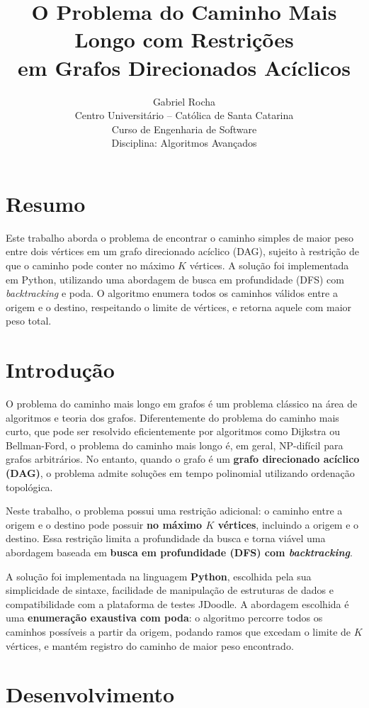 \documentclass[12pt]{article}
\title{O Problema do Caminho Mais Longo com Restrições\\em Grafos Direcionados Acíclicos}
\author{
  Gabriel Rocha\\
  Centro Universitário -- Católica de Santa Catarina\\
  Curso de Engenharia de Software\\
  Disciplina: Algoritmos Avançados
}
\date{}
\begin{document}
\maketitle

\section*{Resumo}

Este trabalho aborda o problema de encontrar o caminho simples de maior peso entre dois vértices em um grafo direcionado acíclico (DAG), sujeito à restrição de que o caminho pode conter no máximo $K$ vértices. A solução foi implementada em Python, utilizando uma abordagem de busca em profundidade (DFS) com \textit{backtracking} e poda. O algoritmo enumera todos os caminhos válidos entre a origem e o destino, respeitando o limite de vértices, e retorna aquele com maior peso total.

\section{Introdução}

O problema do caminho mais longo em grafos é um problema clássico na área de algoritmos e teoria dos grafos. Diferentemente do problema do caminho mais curto, que pode ser resolvido eficientemente por algoritmos como Dijkstra ou Bellman-Ford, o problema do caminho mais longo é, em geral, NP-difícil para grafos arbitrários. No entanto, quando o grafo é um \textbf{grafo direcionado acíclico (DAG)}, o problema admite soluções em tempo polinomial utilizando ordenação topológica.

Neste trabalho, o problema possui uma restrição adicional: o caminho entre a origem e o destino pode possuir \textbf{no máximo $K$ vértices}, incluindo a origem e o destino. Essa restrição limita a profundidade da busca e torna viável uma abordagem baseada em \textbf{busca em profundidade (DFS) com \textit{backtracking}}.

A solução foi implementada na linguagem \textbf{Python}, escolhida pela sua simplicidade de sintaxe, facilidade de manipulação de estruturas de dados e compatibilidade com a plataforma de testes JDoodle. A abordagem escolhida é uma \textbf{enumeração exaustiva com poda}: o algoritmo percorre todos os caminhos possíveis a partir da origem, podando ramos que excedam o limite de $K$ vértices, e mantém registro do caminho de maior peso encontrado.

\section{Desenvolvimento}
\end{document}
